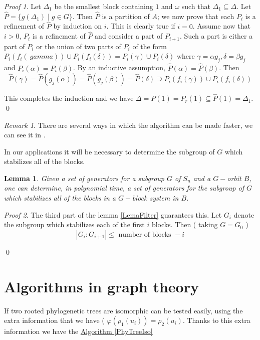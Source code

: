 \documentclass[12pt,a4paper]{book}
\theoremstyle{plain}
\newtheorem{lema}{Lemma}
\theoremstyle{definition}
\theoremstyle{remark}
\newtheorem{observation}{Remark}
\newtheorem*{Proof}{Proof}
\begin{document}
\begin{Proof}
 Let $\Delta_1$ be the smallest block containing $1$ and $\omega$ such that $\Delta_1 \subseteq \Delta$. Let $\hat{P} = \{ g( \Delta_1 ) \; | \; g \in G \}$. 
Then $\hat{P}$ is a partition of $A$; we now prove that each $P_i$ is a refinement of $\hat{P}$ by induction on $i$. 
This is clearly true if $i = 0$. Assume now that $i>0$, $P_i$ is a refinement of $\hat{P}$ and consider a part of $P_{i+1}$. 
Such a part is either a part of $P_i$ or the union of 
two parts of $P_i$ of the form $P_i ( f_i ( \ gamma)) \cup P_i ( f_i ( \delta)) = P_i ( \gamma) \cup P_i ( \delta)$ where $\gamma = \alpha g_j , \delta = \beta g_j$ 
and $P_i ( \alpha ) = P_i ( \beta)$. By an inductive assumption, $\hat{P} ( \alpha ) = \hat{P} ( \beta)$. Then 
\[
 \hat{P} ( \gamma) = \hat{P}( g_j ( \alpha)) = \hat{P} ( g_j ( \beta)) = \hat{P} ( \delta) \supseteq P_i ( f_i ( \gamma)) \cup P_i ( f_i ( \delta ))
\]

This completes the induction and we have $\Delta = \bar{P} (1) = P_r ( 1) \subseteq \hat{P} (1) = \Delta_1$. 
\qed  \end{Proof}

\begin{observation}
 There are several ways in which the algorithm can be made faster, we can see it in \cite{Atkinson1975}.
\end{observation}

In our applications it will be necessary to determine the subgroup of $G$ which stabilizes all of the blocks.

\begin{lema}
 Given a set of generators for a subgroup $G$ of $S_n$ and a $G-$orbit $B$, one can determine, in polynomial time, a set of generators for the 
subgroup of $G$ which stabilizes all of the blocks in a $G-$block system in $B$.
\end{lema}
\begin{Proof}
 The third part of the lemma \ref{LemaFilter} guarantees this. Let $G_i$ denote the subgroup which stabilizes each of the first $i$ blocks. Then ( taking $G= G_0$ ) 
\[
 | G_i : G_{i+1} | \leq \mbox{ number of blocks } - i 
\]

\qed  \end{Proof}

\section{Algorithms in graph theory}

If two rooted phylogenetic trees are isomorphic can be tested easily, using the extra information that we have ( $\varphi ( \rho_1 (u_i))= \rho_2 (u_i)$.
Thanks to this extra information we have the \hyperlink{PhyTreeIso}{Algorithm \ref{PhyTreeIso}}
\end{document}
